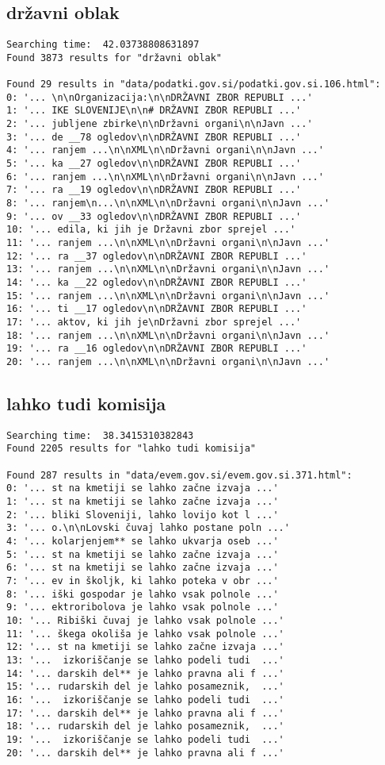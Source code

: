 \documentclass[runningheads]{llncs}
\begin{document}
\subsection{državni oblak}
\begin{lstlisting}
Searching time:  42.03738808631897
Found 3873 results for "državni oblak"

Found 29 results in "data/podatki.gov.si/podatki.gov.si.106.html":
0: '... \n\nOrganizacija:\n\nDRŽAVNI ZBOR REPUBLI ...'
1: '... IKE SLOVENIJE\n\n# DRŽAVNI ZBOR REPUBLI ...'
2: '... jubljene zbirke\n\nDržavni organi\n\nJavn ...'
3: '... de __78 ogledov\n\nDRŽAVNI ZBOR REPUBLI ...'
4: '... ranjem ...\n\nXML\n\nDržavni organi\n\nJavn ...'
5: '... ka __27 ogledov\n\nDRŽAVNI ZBOR REPUBLI ...'
6: '... ranjem ...\n\nXML\n\nDržavni organi\n\nJavn ...'
7: '... ra __19 ogledov\n\nDRŽAVNI ZBOR REPUBLI ...'
8: '... ranjem\n...\n\nXML\n\nDržavni organi\n\nJavn ...'
9: '... ov __33 ogledov\n\nDRŽAVNI ZBOR REPUBLI ...'
10: '... edila, ki jih je Državni zbor sprejel ...'
11: '... ranjem ...\n\nXML\n\nDržavni organi\n\nJavn ...'
12: '... ra __37 ogledov\n\nDRŽAVNI ZBOR REPUBLI ...'
13: '... ranjem ...\n\nXML\n\nDržavni organi\n\nJavn ...'
14: '... ka __22 ogledov\n\nDRŽAVNI ZBOR REPUBLI ...'
15: '... ranjem ...\n\nXML\n\nDržavni organi\n\nJavn ...'
16: '... ti __17 ogledov\n\nDRŽAVNI ZBOR REPUBLI ...'
17: '... aktov, ki jih je\nDržavni zbor sprejel ...'
18: '... ranjem ...\n\nXML\n\nDržavni organi\n\nJavn ...'
19: '... ra __16 ogledov\n\nDRŽAVNI ZBOR REPUBLI ...'
20: '... ranjem ...\n\nXML\n\nDržavni organi\n\nJavn ...'
\end{lstlisting}

\subsection{lahko tudi komisija}
\begin{lstlisting}
Searching time:  38.3415310382843
Found 2205 results for "lahko tudi komisija"

Found 287 results in "data/evem.gov.si/evem.gov.si.371.html":
0: '... st na kmetiji se lahko začne izvaja ...'
1: '... st na kmetiji se lahko začne izvaja ...'
2: '... bliki Sloveniji, lahko lovijo kot l ...'
3: '... o.\n\nLovski čuvaj lahko postane poln ...'
4: '... kolarjenjem** se lahko ukvarja oseb ...'
5: '... st na kmetiji se lahko začne izvaja ...'
6: '... st na kmetiji se lahko začne izvaja ...'
7: '... ev in školjk, ki lahko poteka v obr ...'
8: '... iški gospodar je lahko vsak polnole ...'
9: '... ektroribolova je lahko vsak polnole ...'
10: '... Ribiški čuvaj je lahko vsak polnole ...'
11: '... škega okoliša je lahko vsak polnole ...'
12: '... st na kmetiji se lahko začne izvaja ...'
13: '...  izkoriščanje se lahko podeli tudi  ...'
14: '... darskih del** je lahko pravna ali f ...'
15: '... rudarskih del je lahko posameznik,  ...'
16: '...  izkoriščanje se lahko podeli tudi  ...'
17: '... darskih del** je lahko pravna ali f ...'
18: '... rudarskih del je lahko posameznik,  ...'
19: '...  izkoriščanje se lahko podeli tudi  ...'
20: '... darskih del** je lahko pravna ali f ...'
\end{lstlisting}
\end{document}
